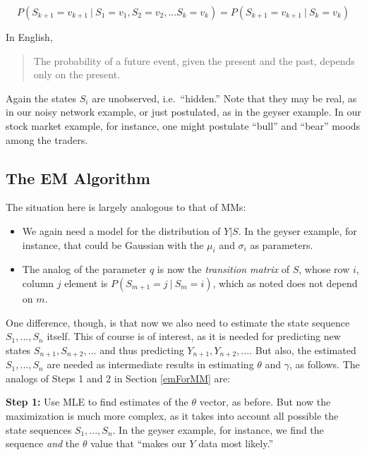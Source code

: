 \documentclass[11pt]{article}
\begin{document}
\begin{equation}
P(S_{k+1} = v_{k+1} ~|~ S_1 = v_1, S_2 = v_2, ...  S_k = v_k) =
P(S_{k+1} = v_{k+1} ~|~ S_k = v_k) 
\end{equation}

In English,

\begin{quote}
The probability of a future event, given the present and the past,
depends only on the present.
\end{quote}

Again the states $S_i$ are unobserved, i.e.\ ``hidden.''  Note that they 
may be real, as in our noisy network example, or just postulated, as in
the geyser example.  In our stock market example, for instance,
one might postulate ``bull'' and ``bear'' moods among the traders.

\subsection{The EM Algorithm}

The situation here is largely analogous to that of MMs:  

\begin{itemize}

\item We again need a model for the distribution of $Y | S$.  In the
geyser example, for instance, that could be Gaussian with the
$\mu_i$ and $\sigma_i$ as parameters.

\item The analog of the parameter $q$ is now the \textit{transition
matrix} of $S$, whose row $i$, column $j$ element is $P(S_{m+1} = j
~|~ S_m = i)$, which as noted does not depend on $m$.

\end{itemize} 

One difference, though, is that now we also need to estimate the state
sequence $S_1,...,S_n$ itself.  This of course is of interest, as it is
needed for predicting new states $S_{n+1}, S_{n+2},...$ and thus
predicting $Y_{n+1}, Y_{n+2},...$.  But also, the estimated
$S_1,...,S_n$ are needed as intermediate results in estimating $\theta$
and $\gamma$, as follows.  The analogs of Steps 1 and 2 in Section
\ref{emForMM} are:

\textbf{Step 1:} Use MLE to find estimates of the $\theta$ vector, as
before.  But now the maximization is much more complex, as it takes into
account all possible the state sequences $S_1,...,S_n$.  In the geyser
example, for instance, we find the sequence \textit{and} the $\theta$
value that ``makes our $Y$ data most likely.''
\end{document}
